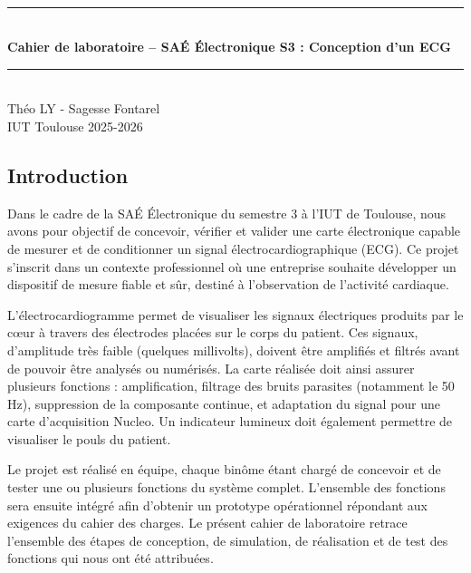 \documentclass{article}
\begin{document}
\pagestyle{fancy}
\renewcommand{\footrulewidth}{0.4pt}

\begin{titlepage}
    \newcommand{\HRule}{\rule{\linewidth}{0.5mm}}
    \center
    \textsc{\LARGE} \\[1cm]
    \HRule \\[0.4cm]
    { \huge \bfseries Cahier de laboratoire – SAÉ Électronique S3 : Conception d’un ECG \\[0.3cm] }
    \HRule \\[0.5cm]
    Théo LY - Sagesse Fontarel
    \\[1cm]
    IUT Toulouse 2025-2026
     \\ [1cm]
     \thispagestyle{empty}
\end{titlepage}


\newpage
\setcounter{page}{1}
\tableofcontents
\newpage

\subsection{Introduction}

Dans le cadre de la SAÉ Électronique du semestre 3 à l’IUT de Toulouse, nous avons pour objectif de concevoir, vérifier et valider une carte électronique capable de mesurer et de conditionner un signal électrocardiographique (ECG). Ce projet s’inscrit dans un contexte professionnel où une entreprise souhaite développer un dispositif de mesure fiable et sûr, destiné à l’observation de l’activité cardiaque.

L’électrocardiogramme permet de visualiser les signaux électriques produits par le cœur à travers des électrodes placées sur le corps du patient. Ces signaux, d’amplitude très faible (quelques millivolts), doivent être amplifiés et filtrés avant de pouvoir être analysés ou numérisés. La carte réalisée doit ainsi assurer plusieurs fonctions : amplification, filtrage des bruits parasites (notamment le 50 Hz), suppression de la composante continue, et adaptation du signal pour une carte d’acquisition Nucleo. Un indicateur lumineux doit également permettre de visualiser le pouls du patient.

Le projet est réalisé en équipe, chaque binôme étant chargé de concevoir et de tester une ou plusieurs fonctions du système complet. L’ensemble des fonctions sera ensuite intégré afin d’obtenir un prototype opérationnel répondant aux exigences du cahier des charges.  
Le présent cahier de laboratoire retrace l’ensemble des étapes de conception, de simulation, de réalisation et de test des fonctions qui nous ont été attribuées.
\end{document}
